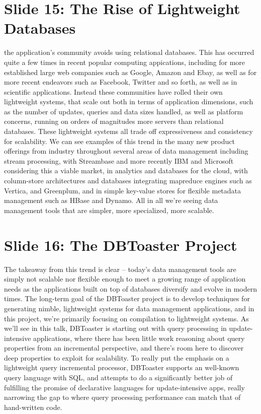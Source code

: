 \documentclass{article}
\begin{document}
\section{Slide 15: The Rise of Lightweight Databases}
the application's community avoids using relational databases. This
has occurred quite a few times in recent popular computing appications,
including for more established large web companies such as Google, Amazon and
Ebay, as well as for more recent endeavors such as Facebook, Twitter and so
forth, as well as in scientific applications. Instead these communities have
rolled their own lightweight systems, that scale out both in terms of
application dimensions, such as the number of updates, queries and data sizes
handled, as well as platform concerns, running on orders of magnitudes more
servers than relational databases. These lightweight systems all trade off
expressiveness and consistency for scalability.
We can see examples of this trend in the many new product offerings from
industry throughout several areas of data management including
stream processing, with Streambase and more recently IBM and Microsoft
considering this a viable market, in analytics and databases for the cloud, with
column-store architectures and databases integrating mapreduce engines such as
Vertica, and Greenplum, and in simple key-value stores for flexible metadata
management such as HBase and Dynamo.
All in all we're seeing data management tools that are simpler, more
specialized, more scalable.

\section{Slide 16: The DBToaster Project}
The takeaway from this trend is clear -- today's data management tools are
simply not scalable nor flexible enough to meet a growing range of application
needs as the applications built on top of databases diversify and evolve in
modern times. The long-term goal of the DBToaster project is to develop
techniques for generating nimble, lightweight systems for data management
applications, and in this project, we're primarily focusing on compilation to
lightweight systems. As we'll see in this talk, DBToaster is starting out with
query processing in update-intensive applications, where there has been little
work reasoning about query properties from an incremental perspective, and
there's room here to discover deep properties to exploit for scalability.  To
really put the emphasis on a lightweight query incremental processor, DBToaster
supports an well-known query language with SQL, and attempts to do a
significantly better job of fulfilling the promise of declarative languages for
update-intensive apps, really narrowing the gap to where query
processing performance can match that of hand-written code.
\end{document}
